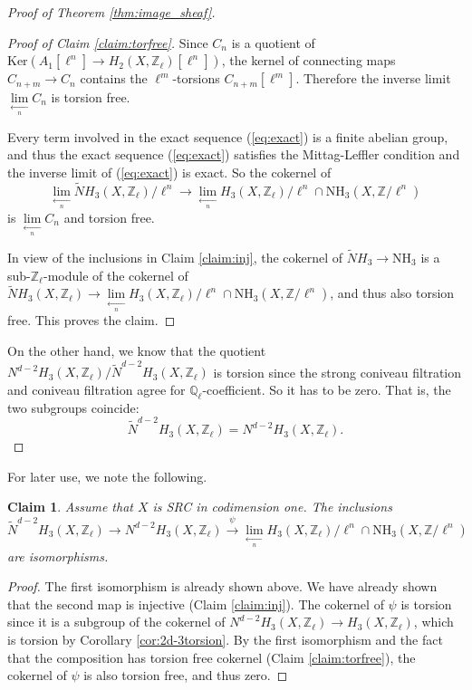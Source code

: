 \documentclass{amsart}
\newtheorem{claim}[theorem]{Claim}
\theoremstyle{definition}
\theoremstyle{remark}
\newcommand{\mbb}{\mathbb}
\newcommand{\QQ}{\mbb{Q}}
\newcommand{\ZZ}{\mbb{Z}}
\begin{document}
\begin{proof}[Proof of Theorem {\ref{thm:image_sheaf}}]
\begin{proof}[Proof of Claim \ref{claim:torfree}]
Since $C_n$ is a quotient of $\text{Ker}(A_1[\ell^n] \to H_2(X, \ZZ_\ell)[\ell^n])$, the kernel of connecting maps $C_{n+m} \to C_n$ contains the $\ell^m$-torsions $C_{n+m}[\ell^m]$. 
Therefore the inverse limit $\lim \limits_{\xleftarrow[n]{}} C_n$ is torsion free. 

Every term involved in the exact sequence (\ref{eq:exact}) is a finite abelian group, and thus the exact sequence (\ref{eq:exact}) satisfies the Mittag-Leffler condition and the inverse limit of (\ref{eq:exact}) is exact. 
So the cokernel of 
\[
\lim \limits_{\xleftarrow[n]{}}\tilde{N}H_3(X, \ZZ_\ell)/\ell^n \to \lim \limits_{\xleftarrow[n]{}} H_3(X, \ZZ_\ell)/\ell^n \cap \text{NH}_3(X, \ZZ/\ell^n)
\]
is $\lim \limits_{\xleftarrow[n]{}} C_n$ and torsion free.

In view of the inclusions in Claim \ref{claim:inj}, the cokernel of $\tilde{N}H_3 \to \text{NH}_3$ is a sub-$\ZZ_\ell$-module of the cokernel of $\tilde{N}H_3(X, \ZZ_\ell) \to \lim \limits_{\xleftarrow[n]{}} H_3(X, \ZZ_\ell)/\ell^n \cap \text{NH}_3(X, \ZZ/\ell^n)$, and thus also torsion free. This proves the claim. 
\end{proof}

On the other hand, we know that the quotient $N^{d-2}H_3(X, \ZZ_\ell)/\tilde{N}^{d-2}H_3(X, \ZZ_\ell)$ is torsion since the strong coniveau filtration and coniveau filtration agree for $\QQ_\ell$-coefficient. 
So it has to be zero. 
That is, the two subgroups coincide:
\[
\tilde{N}^{d-2}H_3(X, \ZZ_\ell)=N^{d-2}H_3(X, \ZZ_\ell).\]
\end{proof}


For later use, we note the following. 
\begin{claim}\label{claim:equal}
    Assume that $X$ is SRC in codimension one. The inclusions
\begin{equation}\label{eq:equality}
\tilde{N}^{d-2}H_3(X, \ZZ_\ell) \to N^{d-2}H_3(X, \ZZ_\ell) \xrightarrow{\psi} \lim \limits_{\xleftarrow[n]{}} H_3(X, \ZZ_\ell)/\ell^n \cap \text{NH}_3(X, \ZZ/\ell^n)  
\end{equation}
are isomorphisms.
\end{claim}
\begin{proof}
    The first isomorphism is already shown above.
We have already shown that the second map is injective (Claim \ref{claim:inj}).
The cokernel of $\psi$ is torsion since  it is a subgroup of the cokernel of $N^{d-2}H_3(X, \ZZ_\ell) \to H_3(X, \ZZ_\ell)$, which is torsion by Corollary \ref{cor:2d-3torsion}. By the first isomorphism and the fact that the composition has torsion free cokernel (Claim \ref{claim:torfree}), the cokernel of $\psi$ is also torsion free, and thus zero.
\end{proof}
\end{document}
